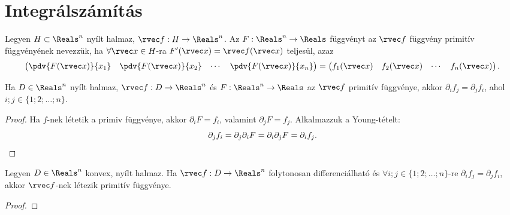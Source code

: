 \clearpage
\section{Integrálszámítás}\label{sec-03-05}

\begin{definition}
  Legyen $H \subset \Reals^n$ nyílt halmaz, $\rvec f: H \to \Reals^n$. Az
  $F: \Reals^n \to \Reals$ függvényt az $\rvec f$ függvény primitív
  függvényének nevezzük, ha $\forall \rvec x \in H$-ra
  $F'(\rvec x) = \rvec f(\rvec x)$ teljesül, azaz
  $$
    \begin{pmatrix}
      \displaystyle\pdv{F(\rvec x)}{x_1} &
      \displaystyle\pdv{F(\rvec x)}{x_2} &
      \cdots                             &
      \displaystyle\pdv{F(\rvec x)}{x_n}
    \end{pmatrix}
    =
    \begin{pmatrix}
      f_1(\rvec x) &
      f_2(\rvec x) &
      \cdots       &
      f_n(\rvec x)
    \end{pmatrix}
    \text.
  $$
\end{definition}

\begin{theorem}
  Ha $D \in \Reals^n$ nyílt halmaz, $\rvec f: D \to \Reals^n$ és
  $F: \Reals^n \to \Reals$ az $\rvec f$ primitív függvénye, akkor
  $\partial_i f_j = \partial_j f_i$, ahol $i;j \in \{1;2;\ldots;n\}$.

  \begin{proof}
    Ha $f$-nek létetik a primiv függvénye, akkor $\partial_i F = f_i$, valamint
    $\partial_j F = f_j$. Alkalmazzuk a Young-tételt:
    $$
      \partial_j f_i
      = \partial_j \partial_i F
      = \partial_i \partial_j F
      = \partial_i f_j
      \text.
    $$
  \end{proof}
\end{theorem}

\begin{theorem}
  Legyen $D \in \Reals^n$ konvex, nyílt halmaz. Ha $\rvec f: D \to \Reals^n$
  folytonosan differenciálható és $\forall i;j \in \{1;2;\ldots;n\}$-re
  $\partial_i f_j = \partial_j f_i$, akkor $\rvec f$-nek létezik primitív
  függvénye.

  \begin{proof}
    \vspace{10em}
  \end{proof}
\end{theorem}

